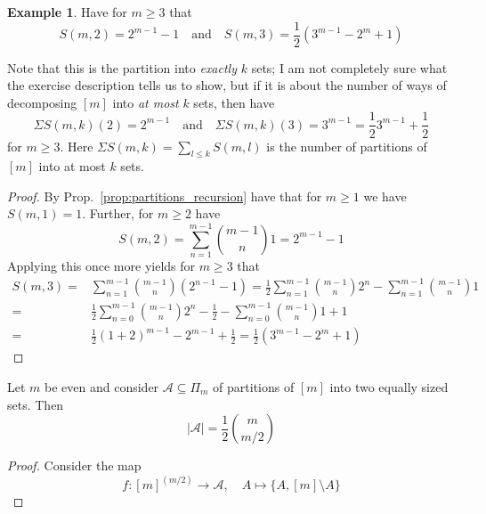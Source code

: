 \documentclass{scrartcl}
\theoremstyle{definition}
\newtheorem{example}[definition]{Example}
\begin{document}
\begin{example}
    \label{ex:partitions_have_no_lym}
    Have for $m \geq 3$ that
    \begin{equation*}
        S(m, 2) = 2^{m - 1} - 1 \quad \text{and} \quad S(m, 3) = \frac 1 2 (3^{m - 1} - 2^m + 1)
    \end{equation*}

    Note that this is the partition into \emph{exactly} $k$ sets; 
    I am not completely sure what the exercise description tells us to show, but if it is about the number of ways of decomposing $[m]$ into \emph{at most} $k$ sets, then have
    \begin{equation*}
        \Sigma S(m, k)(2) = 2^{m - 1} \quad \text{and} \quad \Sigma S(m, k)(3) = 3^{m - 1} = \frac 1 2 3^{m - 1} + \frac 1 2
    \end{equation*}
    for $m \geq 3$.
    Here $\Sigma S(m, k) = \sum_{l \leq k} S(m, l)$ is the number of partitions of $[m]$ into at most $k$ sets.
    \begin{proof}
        By Prop.~\ref{prop:partitions_recursion} have that for $m \geq 1$ we have $S(m, 1) = 1$.
        Further, for $m \geq 2$ have
        \begin{equation*}
            S(m, 2) = \sum_{n = 1}^{m - 1} {m - 1 \choose n} 1 = 2^{m - 1} - 1
        \end{equation*}
        Applying this once more yields for $m \geq 3$ that
        \begin{align*}
            S(m, 3) =& \sum_{n = 1}^{m - 1} {m - 1 \choose n} (2^{n - 1} - 1) = \frac 1 2 \sum_{n = 1}^{m - 1} {m - 1 \choose n} 2^n - \sum_{n = 1}^{m - 1} {m - 1 \choose n} 1 \\
            =&\frac 1 2 \sum_{n = 0}^{m - 1} {m - 1 \choose n} 2^n - \frac 1 2 - \sum_{n = 0}^{m - 1} {m - 1 \choose n} 1 + 1 \\
            =& \frac 1 2 (1 + 2)^{m - 1} - 2^{m - 1} + \frac 1 2 = \frac 1 2 (3^{m - 1} - 2^m + 1)
        \end{align*}
    \end{proof}
    Let $m$ be even and consider $\mathcal{A} \subseteq \Pi_m$ of partitions of $[m]$ into two equally sized sets.
    Then
    \begin{equation*}
        |\mathcal{A}| = \frac 1 2 {m \choose m/2}
    \end{equation*}
    \begin{proof}
        Consider the map
        \begin{equation*}
            f: [m]^{(m/2)} \to \mathcal{A}, \quad A \mapsto \{ A, [m] \setminus A \}

\end{equation*}
\end{proof}
\end{example}
\end{document}

